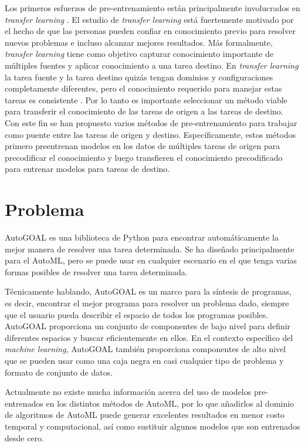 Los primeros esfuerzos de pre-entrenamiento están principalmente involucrados en \textit{transfer learning} \parencite{9}. El estudio de \textit{transfer learning} está fuertemente motivado por el hecho de que las personas pueden confiar en conocimiento previo para resolver nuevos problemas e incluso alcanzar mejores resultados. Más formalmente, \textit{transfer learning} tiene como objetivo capturar conocimiento importante de múltiples fuentes y aplicar conocimiento a una tarea destino. En \textit{transfer learning} la tarea fuente y la tarea destino quizás tengan dominios y configuraciones completamente diferentes, pero el conocimiento requerido para manejar estas tareas es consistente \parencite{10}. Por lo tanto es importante seleccionar un método viable para transferir el conocimiento de las tareas de origen a las tareas de destino. Con este fin se han propuesto varios métodos de pre-entrenamiento para trabajar como puente entre las tareas de origen y destino. Específicamente, estos métodos primero preentrenan modelos en los datos de múltiples tareas de origen para precodificar el conocimiento y luego transfieren el conocimiento precodificado para entrenar modelos para tareas de destino.


\section*{Problema}
AutoGOAL \parencite{71} es una biblioteca de Python para encontrar automáticamente la mejor manera de resolver una tarea determinada. Se ha diseñado principalmente para el AutoML, pero se puede usar en cualquier escenario en el que tenga varias formas posibles de resolver una tarea determinada.

Técnicamente hablando, AutoGOAL es un marco para la síntesis de programas, es decir, encontrar el mejor programa para resolver un problema dado, siempre que el usuario pueda describir el espacio de todos los programas posibles. AutoGOAL proporciona un conjunto de componentes de bajo nivel para definir diferentes espacios y buscar eficientemente en ellos. En el contexto específico del \textit{machine learning}, AutoGOAL también proporciona componentes de alto nivel que se pueden usar como una caja negra en casi cualquier tipo de problema y formato de conjunto de datos.

Actualmente no existe mucha información acerca del uso de modelos pre-entrenados en los distintos métodos de AutoML, por lo que añadirlos al dominio de algoritmos de AutoML puede generar excelentes resultados en menor costo temporal y computacional, así como sustituir algunos modelos que son entrenados desde cero.

